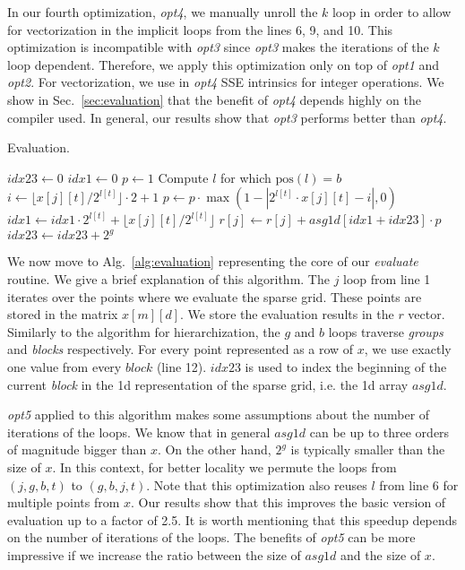 In our fourth optimization, \textit{opt4}, we manually unroll the $k$ loop in order to allow for vectorization in the implicit loops from the lines 6, 9, and 10. This optimization is incompatible with \textit{opt3} since \textit{opt3} makes the iterations of the $k$ loop dependent. Therefore, we apply this optimization only on top of \textit{opt1} and \textit{opt2}. For vectorization, we use in \textit{opt4} SSE intrinsics for integer operations. We show in Sec.~\ref{sec:evaluation} that the benefit of \textit{opt4} depends highly on the compiler used. In general, our results show that \textit{opt3} performs better than \textit{opt4}.

\begin{algorithm}[tbp]
\small{
 \caption{Evaluation.}
 \label{alg:evaluation}                       
 \begin{algorithmic}[1]
		\STATE $\textit{idx23} \leftarrow 0$
				\STATE $\textit{idx1} \leftarrow 0$
				\STATE $\textit{p} \leftarrow 1$
				\STATE Compute $l$ for which $\text{pos}(l) = b$
					\STATE $i \leftarrow \lfloor x[j][t] / 2^{l[t]} \rfloor \cdot 2 + 1$
					\STATE $p \leftarrow p \cdot \max(1 - |2^{l[t]} \cdot x[j][t] - i|, 0)$
					\STATE $\textit{idx1} \leftarrow \textit{idx1} \cdot 2^{l[t]} + \lfloor x[j][t] / 2^{l[t]} \rfloor$
				\ENDFOR
				\STATE $r[j] \leftarrow r[j] + \textit{asg1d}[\textit{idx1} + \textit{idx23}] \cdot p$
				\STATE $\textit{idx23} \leftarrow \textit{idx23} + 2^g$
			\ENDFOR
		\ENDFOR
    \ENDFOR
 \end{algorithmic}
}
\end{algorithm}

We now move to Alg.~\ref{alg:evaluation} representing the core of our \textit{evaluate} routine. We give a brief explanation of this algorithm. The $j$ loop from line 1 iterates over the points where we evaluate the sparse grid. These points are stored in the matrix $x[m][d]$. We store the evaluation results in the $r$ vector. Similarly to the algorithm for hierarchization, the $g$ and $b$ loops traverse \textit{groups} and \textit{blocks} respectively. For every point represented as a row of $x$, we use exactly one value from every $block$ (line 12). $\textit{idx23}$ is used to index the beginning of the current \textit{block} in the 1d representation of the sparse grid, i.e. the 1d array $\textit{asg1d}$.   

\textit{opt5} applied to this algorithm makes some assumptions about the number of iterations of the loops. We know that in general $\textit{asg1d}$ can be up to three orders of magnitude bigger than $x$. On the other hand, $2^g$ is typically smaller than the size of $x$. In this context, for better locality we permute the loops from $(j, g, b, t)$ to $(g, b, j, t)$. Note that this optimization also reuses $l$ from line 6 for multiple points from $x$. Our results show that this improves the basic version of evaluation up to a factor of 2.5. It is worth mentioning that this speedup depends on the number of iterations of the loops. The benefits of \textit{opt5} can be more impressive if we increase the ratio between the size of $\textit{asg1d}$ and the size of $x$.

